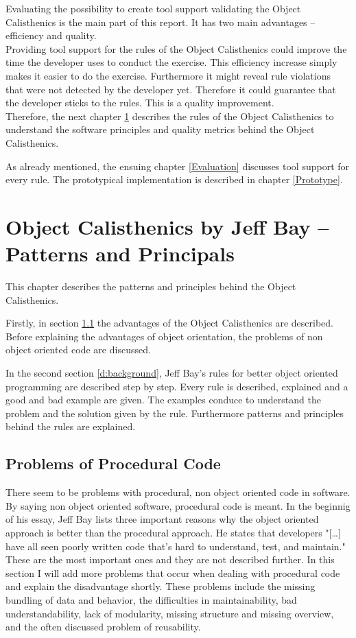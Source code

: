 Evaluating the possibility to create tool support validating the Object Calisthenics is the main part of this report. It has two main advantages -- efficiency and quality.\\

Providing tool support for the rules of the Object Calisthenics could improve the time the developer uses to conduct the exercise. This efficiency increase simply makes it easier to do the exercise. Furthermore it might reveal rule violations that were not detected by the developer yet. Therefore it could guarantee that the developer sticks to the rules. This is a quality improvement. \\

Therefore, the next chapter  \ref{Description} describes the rules of the Object Calisthenics to understand the software principles and quality metrics behind the Object Calisthenics. 

As already mentioned, the ensuing chapter \ref{Evaluation} discusses tool support for every rule.  The prototypical implementation is described in chapter \ref{Prototype}.

\chapter{Object Calisthenics by Jeff Bay -- Patterns and Principals}
\label{Description}
This chapter describes the patterns and principles behind the Object Calisthenics. 

Firstly, in section \ref{d:problemsprocedural} the advantages of the Object Calisthenics are described. Before explaining the advantages of object orientation, the problems of non object oriented code are discussed. 

In the second section \ref{d:background}, Jeff Bay's rules for better object oriented programming are described step by step. Every rule is described, explained and a good and bad example are given. The examples conduce to understand the problem and the solution given by the rule. Furthermore patterns and principles behind the rules are explained. 

\section{Problems of Procedural Code}
\label{d:problemsprocedural}
There seem to be problems with procedural, non object oriented code in software. By saying non object oriented software, procedural code is meant. In the beginnig of his essay, Jeff Bay lists three important reasons why the object oriented approach is better than the procedural approach. He states that developers "[\dots] have all seen poorly written code that's hard to understand, test, and maintain." \cite[p. 70]{oc2008} These are the most important ones and they are not described further. In this section I will add more problems that occur when dealing with procedural code and explain the disadvantage shortly. These problems include the missing bundling of data and behavior, the difficulties in maintainability, bad understandability, lack of modularity, missing structure and missing overview, and the often discussed problem of reusability.

